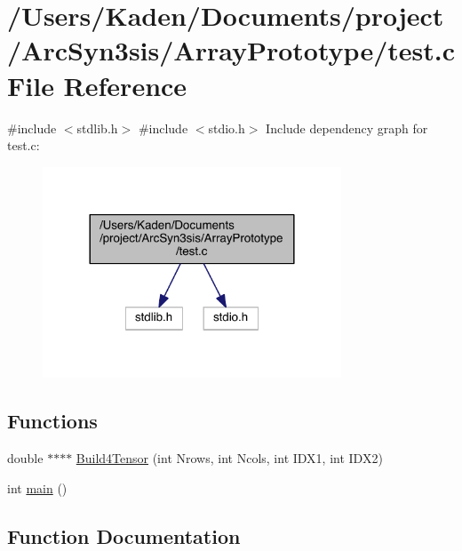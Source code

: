 \hypertarget{a00440}{}\section{/\+Users/\+Kaden/\+Documents/project/\+Arc\+Syn3sis/\+Array\+Prototype/test.c File Reference}
\label{a00440}
{\ttfamily \#include $<$stdlib.\+h$>$}\newline
{\ttfamily \#include $<$stdio.\+h$>$}\newline
Include dependency graph for test.\+c\+:\nopagebreak
\begin{figure}[H]
\begin{center}
\leavevmode
\includegraphics[width=252pt]{a00441}
\end{center}
\end{figure}
\subsection*{Functions}
\begin{DoxyCompactItemize}
\item 
double $\ast$$\ast$$\ast$$\ast$ \hyperlink{a00440_aff625505c4d622f25ca1ff559149e2a5}{Build4\+Tensor} (int Nrows, int Ncols, int I\+D\+X1, int I\+D\+X2)
\item 
int \hyperlink{a00440_ae66f6b31b5ad750f1fe042a706a4e3d4}{main} ()
\end{DoxyCompactItemize}


\subsection{Function Documentation}
\mbox{\label{a00440_aff625505c4d622f25ca1ff559149e2a5}} 
